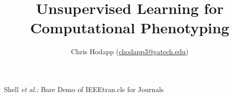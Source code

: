 \documentclass[journal]{IEEEtran}
\begin{document}
%
\title{Unsupervised Learning for Computational Phenotyping}


%
%
%

\author{Chris Hodapp (\url{chodapp3@gatech.edu})
}

%
{Shell \MakeLowercase{\textit{et al.}}: Bare Demo of IEEEtran.cls for Journals}


\end{document}
